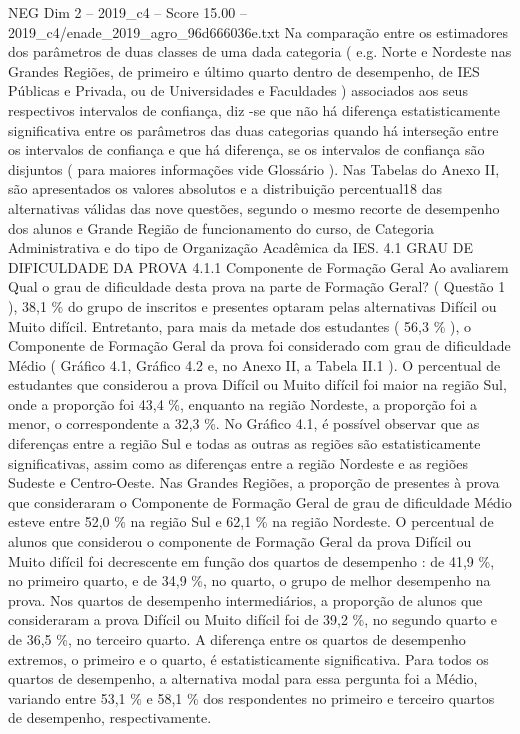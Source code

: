 \begin{textsample}{NEG Dim 2 – 2019\_c4 – Score 15.00 – 2019\_c4/enade\_2019\_agro\_96d666036e.txt}
Na comparação entre os estimadores dos parâmetros de duas classes de uma dada categoria ( e.g.
Norte e Nordeste nas Grandes Regiões, de primeiro e último quarto dentro de desempenho, de IES Públicas e Privada, ou de Universidades e Faculdades ) associados aos seus respectivos intervalos de confiança, diz -se que não há diferença estatisticamente significativa entre os parâmetros das duas categorias quando há interseção entre os intervalos de confiança e que há diferença, se os intervalos de confiança são disjuntos ( para maiores informações vide Glossário ).
Nas Tabelas do Anexo II, são apresentados os valores absolutos e a distribuição percentual18 das alternativas válidas das nove questões, segundo o mesmo recorte de desempenho dos alunos e Grande Região de funcionamento do curso, de Categoria Administrativa e do tipo de Organização Acadêmica da IES. 4.1 GRAU DE DIFICULDADE DA PROVA 4.1.1 Componente de Formação Geral Ao avaliarem Qual o grau de dificuldade desta prova na parte de Formação Geral? ( Questão 1 ), 38,1 \% do grupo de inscritos e presentes optaram pelas alternativas Difícil ou Muito difícil.
Entretanto, para mais da metade dos estudantes ( 56,3 \% ), o Componente de Formação Geral da prova foi considerado com grau de dificuldade Médio ( Gráfico 4.1, Gráfico 4.2 e, no Anexo II, a Tabela II.1 ).
O percentual de estudantes que considerou a prova Difícil ou Muito difícil foi maior na região Sul, onde a proporção foi 43,4 \%, enquanto na região Nordeste, a proporção foi a menor, o correspondente a 32,3 \%.
No Gráfico 4.1, é possível observar que as diferenças entre a região Sul e todas as outras as regiões são estatisticamente significativas, assim como as diferenças entre a região Nordeste e as regiões Sudeste e Centro-Oeste.
Nas Grandes Regiões, a proporção de presentes à prova que consideraram o Componente de Formação Geral de grau de dificuldade Médio esteve entre 52,0 \% na região Sul e 62,1 \% na região Nordeste.
O percentual de alunos que considerou o componente de Formação Geral da prova Difícil ou Muito difícil foi decrescente em função dos quartos de desempenho : de 41,9 \%, no primeiro quarto, e de 34,9 \%, no quarto, o grupo de melhor desempenho na prova.
Nos quartos de desempenho intermediários, a proporção de alunos que consideraram a prova Difícil ou Muito difícil foi de 39,2 \%, no segundo quarto e de 36,5 \%, no terceiro quarto.
A diferença entre os quartos de desempenho extremos, o primeiro e o quarto, é estatisticamente significativa.
Para todos os quartos de desempenho, a alternativa modal para essa pergunta foi a Médio, variando entre 53,1 \% e 58,1 \% dos respondentes no primeiro e terceiro quartos de desempenho, respectivamente.

\end{textsample}
